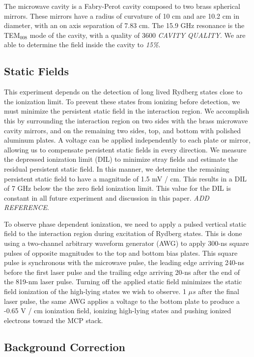 \documentclass[aps,pra,preprint,groupedaddress]{revtex4-1}
\begin{document}
The microwave cavity is a Fabry-Perot cavity composed to two brass spherical mirrors. These mirrors have a radius of curvature of 10 cm and are 10.2 cm in diameter, with an on axis separation of 7.83 cm. The 15.9 GHz resonance is the TEM$_{008}$ mode of the cavity, with a quality of 3600 \emph{CAVITY QUALITY}. We are able to determine the field inside the cavity to \emph{15\%}.

\subsection{\label{fields} Static Fields}

This experiment depends on the detection of long lived Rydberg states close to the ionization limit. To prevent these states from ionizing before detection, we must minimize the persistent static field in the interaction region. We accomplish this by surrounding the interaction region on two sides with the brass microwave cavity mirrors, and on the remaining two sides, top, and bottom with polished aluminum plates. A voltage can be applied independently to each plate or mirror, allowing us to compensate persistent static fields in every direction. We measure the depressed ionization limit (DIL) to minimize stray fields and estimate the residual persistent static field. In this manner, we determine the remaining persistent static field to have a magnitude of 1.5 mV / cm. This results in a DIL of 7 GHz below the the zero field ionization limit. This value for the DIL is constant in all future experiment and discussion in this paper. \emph{ADD REFERENCE}.

To observe phase dependent ionization, we need to apply a pulsed vertical static field to the interaction region during excitation of Rydberg states. This is done using a two-channel arbitrary waveform generator (AWG) to apply 300-ns square pulses of opposite magnitudes to the top and bottom bias plates. This square pulse is synchronous with the microwave pulse, the leading edge arriving 240-ns before the first laser pulse and the trailing edge arriving 20-ns after the end of the 819-nm laser pulse. Turning off the applied static field minimizes the static field ionization of the high-lying states we wish to observe. 1 $\mu s$ after the final laser pulse, the same AWG applies a voltage to the bottom plate to produce a -0.65 V / cm ionization field, ionizing high-lying states and pushing ionized electrons toward the MCP stack.

\subsection{\label{sec:BckCorr} Background Correction}
\end{document}
